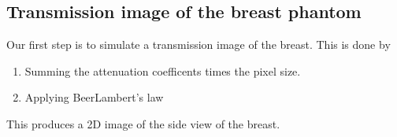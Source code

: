 \documentclass[letterpaper,10pt,english]{sphinxmanual}
\begin{document}
\begin{sphinxVerbatim}[commandchars=\\\{\}]
  \PYG{p}{[}\PYG{p}{]}  

     
   
        
\end{sphinxVerbatim}


\subsection{Transmission image of the breast phantom}
\label{\detokenize{04-BasicSegmentation:transmission-image-of-the-breast-phantom}}
\sphinxAtStartPar
Our first step is to simulate a transmission image of the breast. This is done by
\begin{enumerate}
%
\item {} 
\sphinxAtStartPar
Summing the attenuation coefficents times the pixel size.

\item {} 
\sphinxAtStartPar
Applying Beer\sphinxhyphen{}Lambert’s law

\end{enumerate}

\sphinxAtStartPar
This produces a 2D image of the side view of the breast.
\end{document}
